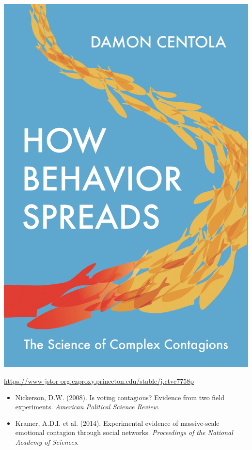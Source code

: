 \documentclass[aspectratio=169]{beamer}
\begin{document}
\begin{frame}

\begin{center}
\includegraphics[height=0.8\textheight]{figures/centola_how_2018_cover}
\end{center}

\vfill
\url{https://www-jstor-org.ezproxy.princeton.edu/stable/j.ctvc7758p}

\end{frame}
\begin{frame}

\begin{itemize}
\item Nickerson, D.W. (2008). Is voting contagious? Evidence from two field experiments. \textit{American Political Science Review}. 
\item Kramer, A.D.I. et al. (2014). Experimental evidence of massive-scale emotional contagion through social networks. \textit{Proceedings of the National Academy of Sciences}.
\end{itemize}

\end{frame}
\end{document}
